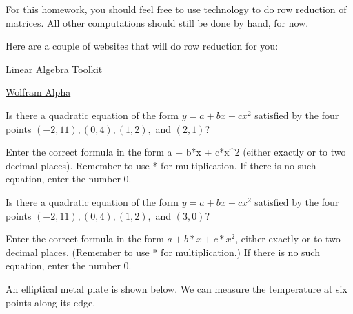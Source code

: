 



For this homework, you should feel free to use technology to do row reduction of matrices.  All other
computations should still be done by hand, for now.  

Here are a couple of websites that will do row reduction for you:

\href{https://tinyurl.com/3xr6ed}{Linear Algebra Toolkit}

\href{https://www.wolframalpha.com/}{Wolfram Alpha}


\endedxtext


\endedxvertical





Is there a quadratic equation of the form
$y = a + bx + cx^2 $ satisfied by the four points 
$(-2,11), (0,4), (1,2),$ and $(2,1)$?


Enter the correct formula in the form a + b*x + c*x^2  (either exactly or to two decimal places).  Remember to use * for multiplication.  If there is no such equation, enter the number 0.  


\edXsolution{
}

\endedxproblem



Is there a quadratic equation of the form
$y = a + bx + cx^2 $ satisfied by the four points 
$(-2,11), (0,4), (1,2),$ and $(3,0)$?


Enter the correct formula in the form $a + b*x + c*x^2$, either exactly or to two decimal places.  (Remember to use * for multiplication.)  If there is no such equation, enter the number 0.  


\edXsolution{
}

\endedxproblem


An elliptical metal plate is shown below.  We can measure the temperature at six points along its edge.  

